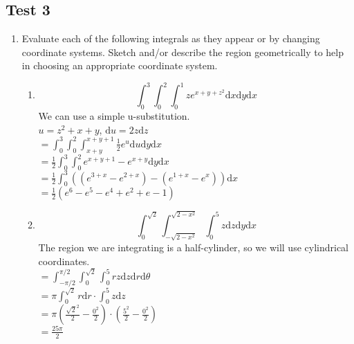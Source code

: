 \subsection{Test 3}
\begin{enumerate}
	\item Evaluate each of the following integrals as they appear or by changing coordinate systems. Sketch and/or describe the region geometrically to help in choosing an appropriate coordinate system.
	\begin{enumerate}[label=\alph*.]
		\item \begin{equation*}
			\int_{0}^{3}{\int_{0}^{2}{\int_{0}^{1}{ze^{x+y+z^2}\mathrm{d}x}\mathrm{d}y}\mathrm{d}x}
		\end{equation*}
		\indent
		We can use a simple u-substitution.\\
		$u = z^2 + x + y$, $\mathrm{d}u = 2z\mathrm{d}z$\\
		$= \int_{0}^{3}{\int_{0}^{2}{\int_{x+y}^{x+y+1}{\frac{1}{2}e^{u}\mathrm{d}u}\mathrm{d}y}\mathrm{d}x}$\\
		$= \frac{1}{2}\int_{0}^{3}{\int_{0}^{2}{e^{x+y+1} - e^{x+y}\mathrm{d}y}\mathrm{d}x}$\\
		$= \frac{1}{2}\int_{0}^{3}{\left((e^{3+x}-e^{2+x}) - (e^{1+x}-e^{x})\right)\mathrm{d}x}$\\
		$= \frac{1}{2}(e^6 - e^5 - e^4 + e^2 + e - 1)$\\
		
		\item \begin{equation*}
			\int_{0}^{\sqrt{2}}{\int_{-\sqrt{2-x^2}}^{\sqrt{2-x^2}}{\int_{0}^{5}{z\mathrm{d}z}\mathrm{d}y}\mathrm{d}x}
		\end{equation*}
		\indent
		The region we are integrating is a half-cylinder, so we will use cylindrical coordinates.\\
		$= \int_{-\pi/2}^{\pi/2}{\int_{0}^{\sqrt{2}}{\int_{0}^{5}{rz\mathrm{d}z}\mathrm{d}r}\mathrm{d}\theta}$\\
		$= \pi\int_{0}^{\sqrt{2}}{r\mathrm{d}r}\cdot\int_{0}^{5}{z\mathrm{d}z}$\\
		$= \pi\left(\frac{\sqrt{2}^{2}}{2} - \frac{0^2}{2}\right) \cdot \left(\frac{5^2}{2} - \frac{0^2}{2}\right)$\\
		$= \frac{25\pi}{2}$\\
		

\end{enumerate}
\end{enumerate}
